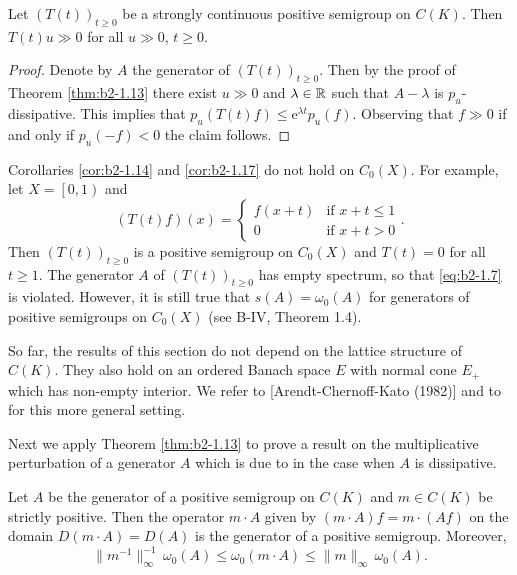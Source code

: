 \begin{corollary}\label{cor:b2-1.17}
Let $(T(t))_{t \geq 0}$ be a strongly continuous positive semigroup on $C(K)$.
Then $T(t)u \gg 0$ for all $u \gg 0$, $t \geq 0$.
\end{corollary}
\begin{proof}
Denote by $A$ the generator of $(T(t))_{t \geq 0}$.
Then by the proof of Theorem \ref{thm:b2-1.13} there exist $u \gg 0$ and $\lambda \in \mathbb{R}$ such that $A - \lambda$ is $p_{u}$-dissipative.
This implies that $p_{u}(T(t)f) \leq \mathrm{e}^{\lambda t}p_{u}(f)$.
Observing that $f \gg 0$ if and only if $p_{u}(-f) < 0$ the claim follows.
\end{proof}
\begin{remark}\label{rem:b2-1.18}
Corollaries \ref{cor:b2-1.14} and \ref{cor:b2-1.17} do not hold on $C_{0}(X)$.
For example, let $X = \left[0,1\right)$ and
\[
    (T(t)f)(x) = \begin{cases}
        f(x+t) & \text{if } x+t \leq 1 \\
        0 & \text{if } x+t > 0
    \end{cases}.
\]
Then $(T(t))_{t \geq 0}$ is a positive semigroup on $C_{0}(X)$ and $T(t) = 0$ for all $t \geq 1$.
The generator $A$ of $(T(t))_{t \geq 0}$ has empty spectrum, so that \eqref{eq:b2-1.7} is violated.
However, it is still true that $s(A) = \omega_{0}(A)$ for generators of positive semigroups on $C_{0}(X)$ (see B-IV, Theorem 1.4).
\end{remark}
\begin{remark}\label{rem:b2-1.19}
So far, the results of this section do not depend on the lattice structure of $C(K)$.
They also hold on an ordered Banach space $E$ with normal cone $E_{+}$ which has non-empty interior.
We refer to \citet{arendtchernoffkato:1982} [Arendt-Chernoff-Kato (1982)] and to \citet{battyrobinson:1984} for this more general setting.
\end{remark}
Next we apply Theorem \ref{thm:b2-1.13} to prove a result on the multiplicative perturbation of a generator $A$ which is due to \citet{dorroh:1966} in the case when $A$ is dissipative.
\begin{theorem}\label{thm:b2-1.20}
Let $A$ be the generator of a positive semigroup on $C(K)$ and  $m \in C(K)$ be strictly positive.
Then the operator $m \cdot A$ given by $(m \cdot A)f = m \cdot (Af)$ on the domain $D(m \cdot A) = D(A)$ is the generator of a positive semigroup.
Moreover,
\begin{equation}\label{eq:b2-1.10}
\|m^{-1}\|_{\infty}^{-1}\, \omega_{0}(A) \leq \omega_{0}(m \cdot A) \leq \|m\|_{\infty}\, \omega_{0}(A).
\end{equation}
\end{theorem}
